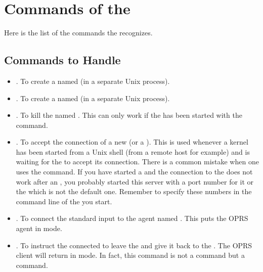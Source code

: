 \section{Commands of the \OPRSS{}}

Here is the list of the commands the \OPRSS{} recognizes.



\subsection{\OPRSS{} Commands to Handle \CPK{}}

\begin{itemize}

\item {}. To create a \CPK{} named 
(in a separate Unix process).

\item {}. To create a \XPK{} named 
(in a separate Unix process).

\item {}. To kill the \CPK{} named .
This can only work if the \CPK{} has been started with the
 command.

\item {}. To accept the connection of a new \CPK{} (or a
\XPK{}). This is used whenever a kernel has been started from a Unix
shell (from a remote host for example) and is waiting for the \OPRSS{}
to accept its connection. There is a common mistake when one uses the
 command. If you have started a \CPK{} and the
connection to the \OPRSS{} does not work after an , you
probably started this server with a port number for it or the \MP{} which is
not the default one. Remember to specify these numbers in the command line of
the \CPK{} you start.

\item {}. To connect the standard input to the \COPRS{}
agent named . This puts the OPRS agent in 
mode.

\item {}. To instruct the connected \COPRS{} to leave the
 and give it back to the \OPRSS{}. The OPRS client will
return in  mode. In fact, this command is not a \OPRSS{} command
but a \CPK{} command.


\end{itemize}
